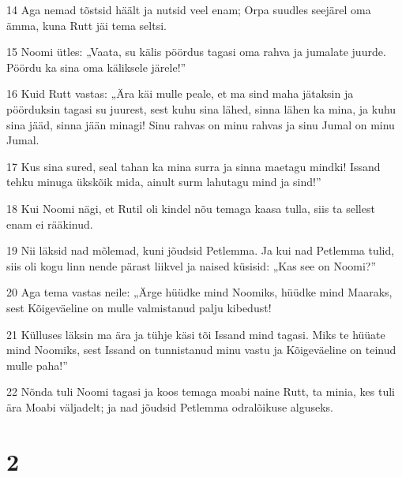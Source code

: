 \par 14 Aga nemad tõstsid häält ja nutsid veel enam; Orpa suudles seejärel oma ämma, kuna Rutt jäi tema seltsi.
\par 15 Noomi ütles: „Vaata, su kälis pöördus tagasi oma rahva ja jumalate juurde. Pöördu ka sina oma käliksele järele!”
\par 16 Kuid Rutt vastas: „Ära käi mulle peale, et ma sind maha jätaksin ja pöörduksin tagasi su juurest, sest kuhu sina lähed, sinna lähen ka mina, ja kuhu sina jääd, sinna jään minagi! Sinu rahvas on minu rahvas ja sinu Jumal on minu Jumal.
\par 17 Kus sina sured, seal tahan ka mina surra ja sinna maetagu mindki! Issand tehku minuga ükskõik mida, ainult surm lahutagu mind ja sind!”
\par 18 Kui Noomi nägi, et Rutil oli kindel nõu temaga kaasa tulla, siis ta sellest enam ei rääkinud.
\par 19 Nii läksid nad mõlemad, kuni jõudsid Petlemma. Ja kui nad Petlemma tulid, siis oli kogu linn nende pärast liikvel ja naised küsisid: „Kas see on Noomi?”
\par 20 Aga tema vastas neile: „Ärge hüüdke mind Noomiks, hüüdke mind Maaraks, sest Kõigeväeline on mulle valmistanud palju kibedust!
\par 21 Külluses läksin ma ära ja tühje käsi tõi Issand mind tagasi. Miks te hüüate mind Noomiks, sest Issand on tunnistanud minu vastu ja Kõigeväeline on teinud mulle paha!”
\par 22 Nõnda tuli Noomi tagasi ja koos temaga moabi naine Rutt, ta minia, kes tuli ära Moabi väljadelt; ja nad jõudsid Petlemma odralõikuse alguseks.

\chapter{2}

